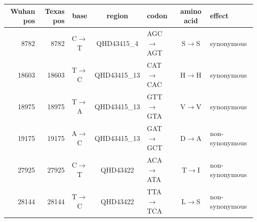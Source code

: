 \begin{tabular}{rrcclcl}
\hline
Wuhan pos & Texas pos & base & region & codon & amino acid & effect \\
\hline
8782 & 8782 & C$\to$T & QHD43415\_4 & AGC$\to$AGT & S$\to$S & synonymous \\
18603 & 18603 & T$\to$C & QHD43415\_13 & CAT$\to$CAC & H$\to$H & synonymous \\
18975 & 18975 & T$\to$A & QHD43415\_13 & GTT$\to$GTA & V$\to$V & synonymous \\
19175 & 19175 & A$\to$C & QHD43415\_13 & GAT$\to$GCT & D$\to$A & non-synonymous \\
27925 & 27925 & C$\to$T & QHD43422 & ACA$\to$ATA & T$\to$I & non-synonymous \\
28144 & 28144 & T$\to$C & QHD43422 & TTA$\to$TCA & L$\to$S & non-synonymous \\
\hline
\end{tabular}